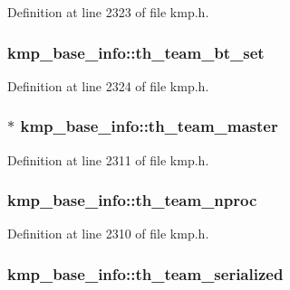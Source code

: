 Definition at line 2323 of file kmp.\-h.

\hypertarget{structkmp__base__info_a0dc8b44fa2597832e4a954013c90cd30}{
\subsubsection[{th\-\_\-team\-\_\-bt\-\_\-set}]{ kmp\-\_\-base\-\_\-info\-::th\-\_\-team\-\_\-bt\-\_\-set}}\label{structkmp__base__info_a0dc8b44fa2597832e4a954013c90cd30}


Definition at line 2324 of file kmp.\-h.

\hypertarget{structkmp__base__info_afac55a0f7c6ea12c3d6a56290319ccb8}{
\subsubsection[{th\-\_\-team\-\_\-master}]{$\ast$ kmp\-\_\-base\-\_\-info\-::th\-\_\-team\-\_\-master}}\label{structkmp__base__info_afac55a0f7c6ea12c3d6a56290319ccb8}


Definition at line 2311 of file kmp.\-h.

\hypertarget{structkmp__base__info_acd206276ce1f5c2d3005b74d4631c45a}{
\subsubsection[{th\-\_\-team\-\_\-nproc}]{ kmp\-\_\-base\-\_\-info\-::th\-\_\-team\-\_\-nproc}}\label{structkmp__base__info_acd206276ce1f5c2d3005b74d4631c45a}


Definition at line 2310 of file kmp.\-h.

\hypertarget{structkmp__base__info_a11cf658fb603478c66c711453fcf2e28}{
\subsubsection[{th\-\_\-team\-\_\-serialized}]{ kmp\-\_\-base\-\_\-info\-::th\-\_\-team\-\_\-serialized}}\label{structkmp__base__info_a11cf658fb603478c66c711453fcf2e28}


